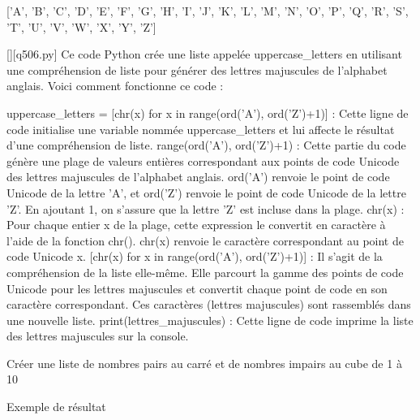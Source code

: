 ['A', 'B', 'C', 'D', 'E', 'F', 'G', 'H', 'I', 'J', 'K', 'L', 'M', 'N', 'O', 'P', 'Q', 'R', 'S', 'T', 'U', 'V', 'W', 'X', 'Y', 'Z']
        \par
        \begin{solution}
            \renewcommand{\nomfichier}{q506.py}
            \pythonfile{\chemincode \nomfichier}[][\nomfichier]
            Ce code Python crée une liste appelée uppercase_letters en utilisant une compréhension de liste pour générer des lettres majuscules de l'alphabet anglais. Voici comment fonctionne ce code :

    uppercase_letters = [chr(x) for x in range(ord('A'), ord('Z')+1)] : Cette ligne de code initialise une variable nommée uppercase_letters et lui affecte le résultat d'une compréhension de liste.
        range(ord('A'), ord('Z')+1) : Cette partie du code génère une plage de valeurs entières correspondant aux points de code Unicode des lettres majuscules de l'alphabet anglais. ord('A') renvoie le point de code Unicode de la lettre 'A', et ord('Z') renvoie le point de code Unicode de la lettre 'Z'. En ajoutant 1, on s'assure que la lettre 'Z' est incluse dans la plage.
        chr(x) : Pour chaque entier x de la plage, cette expression le convertit en caractère à l'aide de la fonction chr(). chr(x) renvoie le caractère correspondant au point de code Unicode x.
        [chr(x) for x in range(ord('A'), ord('Z')+1)] : Il s'agit de la compréhension de la liste elle-même. Elle parcourt la gamme des points de code Unicode pour les lettres majuscules et convertit chaque point de code en son caractère correspondant. Ces caractères (lettres majuscules) sont rassemblés dans une nouvelle liste.
    print(lettres_majuscules) : Cette ligne de code imprime la liste des lettres majuscules sur la console.
        \end{solution}
        

        \question
        Créer une liste de nombres pairs au carré et de nombres impairs au cube de 1 à 10

Exemple de résultat

